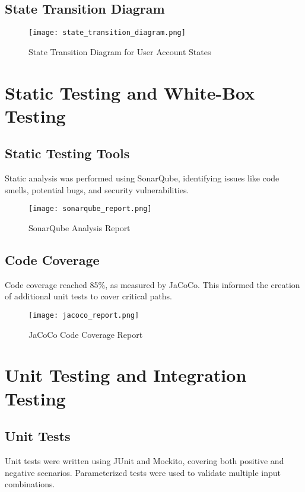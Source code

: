 \documentclass[12pt,a4paper]{report}
\begin{document}
\section{State Transition Diagram}
\begin{figure}[H]
\centering
\texttt{[image: state\_transition\_diagram.png]}
\caption{State Transition Diagram for User Account States}
\end{figure}

\chapter{Static Testing and White-Box Testing}
\section{Static Testing Tools}
Static analysis was performed using SonarQube, identifying issues like code smells, potential bugs, and security vulnerabilities.

\begin{figure}[H]
\centering
\texttt{[image: sonarqube\_report.png]}
\caption{SonarQube Analysis Report}
\end{figure}

\section{Code Coverage}
Code coverage reached 85\%, as measured by JaCoCo. This informed the creation of additional unit tests to cover critical paths.

\begin{figure}[H]
\centering
\texttt{[image: jacoco\_report.png]}
\caption{JaCoCo Code Coverage Report}
\end{figure}

\chapter{Unit Testing and Integration Testing}
\section{Unit Tests}
Unit tests were written using JUnit and Mockito, covering both positive and negative scenarios. Parameterized tests were used to validate multiple input combinations.
\end{document}
